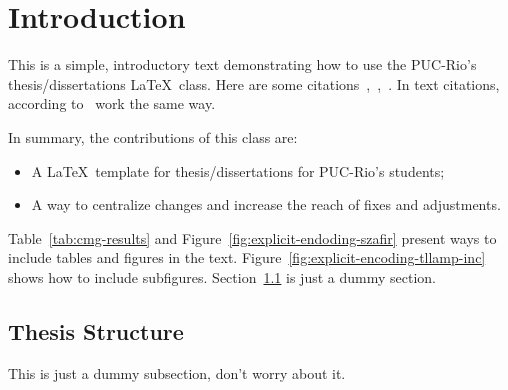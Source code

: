 \newpage

\chapter{Introduction}
\label{chap:introduction}

This is a simple, introductory text demonstrating how to use the PUC-Rio's thesis/dissertations \LaTeX~class. Here are some citations~\cite{Lee2010},~\cite{Hummel2013},~\cite{Dupacova2003}. In text citations, according to~\cite{Armstrong2013} work the same way.

In summary, the contributions of this class are:

\begin{itemize}
  \item A \LaTeX~template for thesis/dissertations for PUC-Rio's students;
  \item A way to centralize changes and increase the reach of fixes and adjustments.
\end{itemize}

Table~\ref{tab:cmg-results} and Figure~\ref{fig:explicit-endoding-szafir} present ways to include tables and figures in the text. Figure~\ref{fig:explicit-encoding-tllamp-inc} shows how to include subfigures. Section~\ref{sec:organization} is just a dummy section.

\section{Thesis Structure}
\label{sec:organization}

This is just a dummy subsection, don't worry about it.


